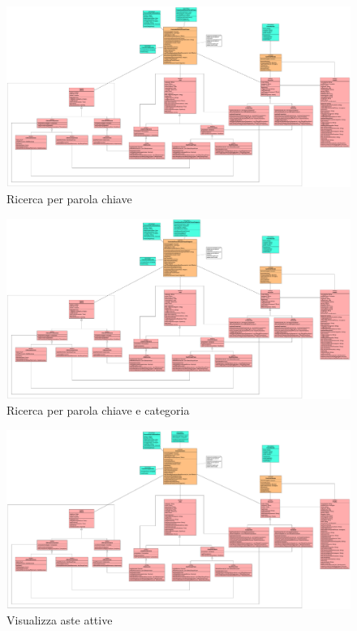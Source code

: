             \begin{figure}[htbp!]
                \centering
                    \includegraphics[width=1\linewidth]{Immagini/Diagrammi/Class Diagram/Analisi/Utente generico/RicercaParolaChiave.pdf}
                \caption{Ricerca per parola chiave}
            \end{figure}
            
            \begin{figure}[htbp!]
                \centering
                    \includegraphics[width=1\linewidth]{Immagini/Diagrammi/Class Diagram/Analisi/Utente generico/RicercaParolaChiaveCategoria.pdf}
                \caption{Ricerca per parola chiave e categoria}
            \end{figure}
            
            \begin{figure}[htbp!]
                \centering
                    \includegraphics[width=1\linewidth]{Immagini/Diagrammi/Class Diagram/Analisi/Utente generico/VisualizzaAsteAttive.pdf}
                \caption{Visualizza aste attive}
            \end{figure}
            
